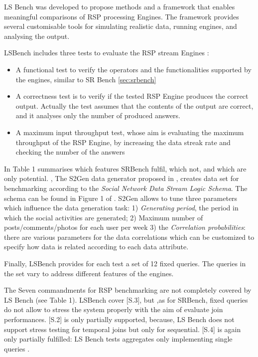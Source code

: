 LS Bench was developed to propose methods and a framework that enables meaningful comparisons of RSP processing Engines. The framework provides several customisable tools for simulating realistic data, running engines, and analysing the output. 

LSBench includes three tests to evaluate the RSP stream Engines \cite{DBLP:conf/semweb/DellAglioCBCV13}:
\begin{itemize}
\item A functional test to verify the operators and the functionalities supported
by the engines, similar to SR Bench \ref{sec:srbench}
\item A correctness test is to verify if the tested RSP Engine produces the correct output. Actually the test assumes that the contents of the output are correct, and it analyses only the number of produced answers.
\item A maximum input throughput test, whose aim is evaluating the maximum throughput of the RSP Engine, by increasing the data streak rate and checking the number of the answers
\end{itemize}

In \cite{DBLP:conf/esws/ScharrenbachUMVB13} Table 1 summarises which features SRBench fulfil, which not, and which are only potential.
\cite{LePhuoc2012c},
The S2Gen data generator proposed in \cite{LePhuoc2012c}, creates data set for benchmarking according to the \textit{Social Network Data Stream Logic Schema}. The schema can be found in Figure 1 of \cite{LePhuoc2012c}. S2Gen allows to tune three parameters which influence the data generation task: 1) \textit{Generating period}, the period in which the social activities are generated; 2) Maximum number of posts/comments/photos for each user per week 3) the \textit{Correlation probabilities}: there are various parameters for the data correlations which can be customized to specify how data is related according to each data attribute.

Finally, LSBench \cite{LePhuoc2012c} provides for each test a set of 12 fixed queries. The queries in the set vary to address different features of the engines. 

The Seven commandments for RSP benchmarking are not completely covered by LS Bench (see \cite{DBLP:conf/esws/ScharrenbachUMVB13} Table 1). LSBench cover [S.3], but ,as for SRBench, fixed queries do not allow to stress the system properly with the aim of evaluate join performances. [S.2] is only partially supported, because, LS Bench does not support stress testing for temporal joins but only for sequential. [S.4] is again only partially fulfilled: LS Bench tests aggregates only implementing single queries \cite{DBLP:conf/esws/ScharrenbachUMVB13}.

